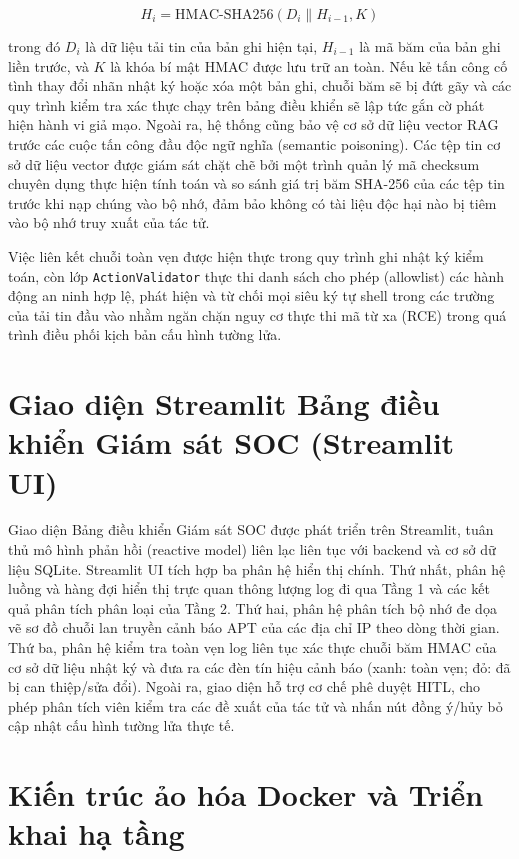 \begin{equation}
    H_i = \text{HMAC-SHA256}(D_i \parallel H_{i-1}, K)
\end{equation}

trong đó $D_i$ là dữ liệu tải tin của bản ghi hiện tại, $H_{i-1}$ là mã băm của bản ghi liền trước, và $K$ là khóa bí mật HMAC được lưu trữ an toàn. Nếu kẻ tấn công cố tình thay đổi nhãn nhật ký hoặc xóa một bản ghi, chuỗi băm sẽ bị đứt gãy và các quy trình kiểm tra xác thực chạy trên bảng điều khiển sẽ lập tức gắn cờ phát hiện hành vi giả mạo. Ngoài ra, hệ thống cũng bảo vệ cơ sở dữ liệu vector RAG trước các cuộc tấn công đầu độc ngữ nghĩa (semantic poisoning). Các tệp tin cơ sở dữ liệu vector được giám sát chặt chẽ bởi một trình quản lý mã checksum chuyên dụng thực hiện tính toán và so sánh giá trị băm SHA-256 của các tệp tin trước khi nạp chúng vào bộ nhớ, đảm bảo không có tài liệu độc hại nào bị tiêm vào bộ nhớ truy xuất của tác tử.

Việc liên kết chuỗi toàn vẹn được hiện thực trong quy trình ghi nhật ký kiểm toán, còn lớp \texttt{ActionValidator} thực thi danh sách cho phép (allowlist) các hành động an ninh hợp lệ, phát hiện và từ chối mọi siêu ký tự shell trong các trường của tải tin đầu vào nhằm ngăn chặn nguy cơ thực thi mã từ xa (RCE) trong quá trình điều phối kịch bản cấu hình tường lửa.

\section{Giao diện Streamlit Bảng điều khiển Giám sát SOC (Streamlit UI)}

Giao diện Bảng điều khiển Giám sát SOC được phát triển trên Streamlit, tuân thủ mô hình phản hồi (reactive model) liên lạc liên tục với backend và cơ sở dữ liệu SQLite. Streamlit UI tích hợp ba phân hệ hiển thị chính. Thứ nhất, phân hệ luồng và hàng đợi hiển thị trực quan thông lượng log đi qua Tầng 1 và các kết quả phân tích phân loại của Tầng 2. Thứ hai, phân hệ phân tích bộ nhớ đe dọa vẽ sơ đồ chuỗi lan truyền cảnh báo APT của các địa chỉ IP theo dòng thời gian. Thứ ba, phân hệ kiểm tra toàn vẹn log liên tục xác thực chuỗi băm HMAC của cơ sở dữ liệu nhật ký và đưa ra các đèn tín hiệu cảnh báo (xanh: toàn vẹn; đỏ: đã bị can thiệp/sửa đổi). Ngoài ra, giao diện hỗ trợ cơ chế phê duyệt HITL, cho phép phân tích viên kiểm tra các đề xuất của tác tử và nhấn nút đồng ý/hủy bỏ cập nhật cấu hình tường lửa thực tế.

\section{Kiến trúc ảo hóa Docker và Triển khai hạ tầng}

